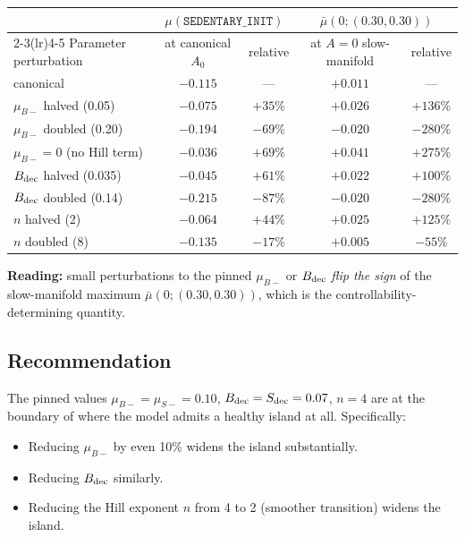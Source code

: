 \documentclass[11pt,a4paper]{article}
\theoremstyle{definition}
\begin{document}
\begin{center}\small
\begin{tabular}{lcc cc}
\toprule
& \multicolumn{2}{c}{$\mu(\texttt{SEDENTARY\_INIT})$} & \multicolumn{2}{c}{$\bar\mu(0; (0.30, 0.30))$} \\
\cmidrule(lr){2-3}\cmidrule(lr){4-5}
Parameter perturbation & at canonical $A_0$ & relative & at $A=0$ slow-manifold & relative \\
\midrule
canonical                       & $-0.115$ & --- & $+0.011$ & --- \\
$\mu_{B-}$ halved (0.05)        & $-0.075$ & $+35\%$ & $+0.026$ & $+136\%$ \\
$\mu_{B-}$ doubled (0.20)       & $-0.194$ & $-69\%$ & $-0.020$ & $-280\%$ \\
$\mu_{B-} = 0$ (no Hill term)   & $-0.036$ & $+69\%$ & $+0.041$ & $+275\%$ \\
$B_{\rm dec}$ halved (0.035)    & $-0.045$ & $+61\%$ & $+0.022$ & $+100\%$ \\
$B_{\rm dec}$ doubled (0.14)    & $-0.215$ & $-87\%$ & $-0.020$ & $-280\%$ \\
$n$ halved (2)                  & $-0.064$ & $+44\%$ & $+0.025$ & $+125\%$ \\
$n$ doubled (8)                 & $-0.135$ & $-17\%$ & $+0.005$ & $-55\%$ \\
\bottomrule
\end{tabular}
\end{center}

\textbf{Reading:} small perturbations to the pinned $\mu_{B-}$ or $B_{\rm dec}$ \emph{flip the sign} of the slow-manifold maximum $\bar\mu(0; (0.30, 0.30))$, which is the controllability-determining quantity.

\subsection{Recommendation}

The pinned values $\mu_{B-} = \mu_{S-} = 0.10$, $B_{\rm dec} = S_{\rm dec} = 0.07$, $n = 4$ are at the boundary of where the model admits a healthy island at all. Specifically:

\begin{itemize}
  \item Reducing $\mu_{B-}$ by even 10\% widens the island substantially.
  \item Reducing $B_{\rm dec}$ similarly.
  \item Reducing the Hill exponent $n$ from 4 to 2 (smoother transition) widens the island.
\end{itemize}
\end{document}

